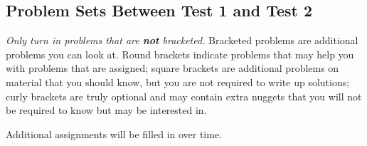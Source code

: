 \documentclass{scrartcl}\usepackage[]{graphicx}\usepackage[]{color}
\begin{document}
\pagestyle{fancy}

\chead{}
\rhead{\thepage/\pageref{end}}
\lfoot{}
\rfoot{}

\begin{center}
  \large
%
%
\subsection*{Problem Sets Between Test 1 and Test 2}

\end{center}


\textit{Only turn in problems that are \textbf{not} bracketed.}
Bracketed problems are additional problems you can look at.
Round brackets indicate problems that may help you with problems that
are assigned; square brackets are additional problems on material
that you should know, but you are not required to write up solutions;
curly brackets are truly optional and may contain extra nuggets that you
will not be required to know but may be interested in.

Additional assignments will be filled in over time.

\bigskip
\end{document}
